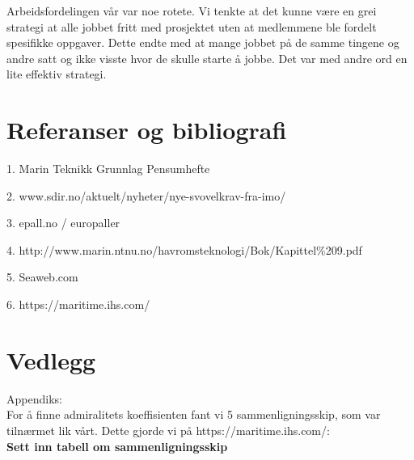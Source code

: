 \documentclass[norsk]{article}
\begin{document}
Arbeidsfordelingen vår var noe rotete. Vi tenkte at det kunne være en grei strategi at alle jobbet fritt med prosjektet uten at medlemmene ble fordelt spesifikke oppgaver. Dette endte med at mange jobbet på de samme tingene og andre satt og ikke visste hvor de skulle starte å jobbe. Det var med andre ord en lite effektiv strategi.\\

\section{Referanser og bibliografi}

1. Marin Teknikk Grunnlag Pensumhefte

2. www.sdir.no/aktuelt/nyheter/nye-svovelkrav-fra-imo/

3. epall.no / europaller

4. http://www.marin.ntnu.no/havromsteknologi/Bok/Kapittel\%209.pdf

5. Seaweb.com

6. https://maritime.ihs.com/


\section{Vedlegg}

Appendiks:\\

For å finne admiralitets koeffisienten fant vi 5 sammenligningsskip, som var tilnærmet lik vårt. Dette gjorde vi på https://maritime.ihs.com/: \\

\textbf{Sett inn tabell om sammenligningsskip}
\end{document}
